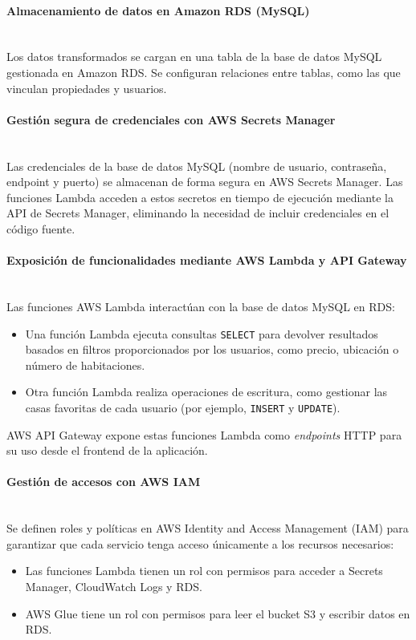 \documentclass{article}
\begin{document}
\paragraph{Almacenamiento de datos en Amazon RDS (MySQL)} \mbox{} \\
Los datos transformados se cargan en una tabla de la base de datos MySQL gestionada en Amazon RDS.  
Se configuran relaciones entre tablas, como las que vinculan propiedades y usuarios.

\paragraph{Gestión segura de credenciales con AWS Secrets Manager} \mbox{} \\
Las credenciales de la base de datos MySQL (nombre de usuario, contraseña, endpoint y puerto) se almacenan de forma segura en AWS Secrets Manager.  
Las funciones Lambda acceden a estos secretos en tiempo de ejecución mediante la API de Secrets Manager, eliminando la necesidad de incluir credenciales en el código fuente.

\paragraph{Exposición de funcionalidades mediante AWS Lambda y API Gateway} \mbox{} \\
Las funciones AWS Lambda interactúan con la base de datos MySQL en RDS:
\begin{itemize}
    \item Una función Lambda ejecuta consultas \texttt{SELECT} para devolver resultados basados en filtros proporcionados por los usuarios, como precio, ubicación o número de habitaciones.
    \item Otra función Lambda realiza operaciones de escritura, como gestionar las casas favoritas de cada usuario (por ejemplo, \texttt{INSERT} y \texttt{UPDATE}).
\end{itemize}
AWS API Gateway expone estas funciones Lambda como \textit{endpoints} HTTP para su uso desde el frontend de la aplicación.

\paragraph{Gestión de accesos con AWS IAM} \mbox{} \\
Se definen roles y políticas en AWS Identity and Access Management (IAM) para garantizar que cada servicio tenga acceso únicamente a los recursos necesarios:
\begin{itemize}
    \item Las funciones Lambda tienen un rol con permisos para acceder a Secrets Manager, CloudWatch Logs y RDS.
    \item AWS Glue tiene un rol con permisos para leer el bucket S3 y escribir datos en RDS.
\end{itemize}
\end{document}
